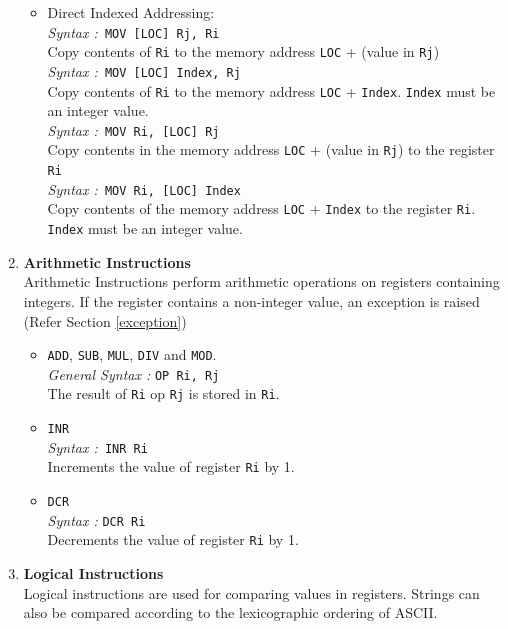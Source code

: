 \documentclass[11pt]{report}
\begin{document}
\begin{enumerate}
\begin{itemize}
\item Direct Indexed Addressing: \\
\textit{Syntax :}\texttt{ MOV [LOC] Rj, Ri}\\
Copy contents of \texttt{Ri} to the memory address \texttt{LOC} + (value in \texttt{Rj}) \\
\textit{Syntax :}\texttt{ MOV [LOC] Index, Rj}\\
Copy contents of \texttt{Ri} to the memory address \texttt{LOC} + \texttt{Index}. \texttt{Index} must be an integer value. \\
\textit{Syntax :}\texttt{ MOV Ri, [LOC] Rj}\\
Copy contents in the memory address \texttt{LOC} + (value in \texttt{Rj}) to the register \texttt{Ri}\\
\textit{Syntax :}\texttt{ MOV Ri, [LOC] Index}\\
Copy contents of the memory address \texttt{LOC} + \texttt{Index} to the register \texttt{Ri}. \texttt{Index} must be an integer value. \\
\end{itemize}


\item\textbf{ Arithmetic Instructions}
\\
Arithmetic Instructions perform arithmetic operations on registers containing integers. If the register contains a non-integer value, an exception is raised (Refer Section \ref{exception})
\begin{itemize}
\item \texttt{ADD}, \texttt{SUB}, \texttt{MUL}, \texttt{DIV} and \texttt{MOD}.\\
\textit{General Syntax :} \texttt{OP Ri, Rj}\\
The result of \texttt{Ri} op \texttt{Rj} is stored in \texttt{Ri}. 

\item \texttt{INR\\}
\textit{Syntax :}\texttt{ INR Ri}\\
Increments the value of register \texttt{Ri} by 1.  

\item  \texttt{DCR}\\
\textit{Syntax :} \texttt{DCR Ri}\\
Decrements the value of register \texttt{Ri} by 1. 

\end{itemize}


\item \textbf{Logical Instructions} \\
Logical instructions are used for comparing values in registers. Strings can also be compared according to the lexicographic ordering of ASCII.
\begin{itemize}


\end{itemize}
\end{enumerate}
\end{document}
